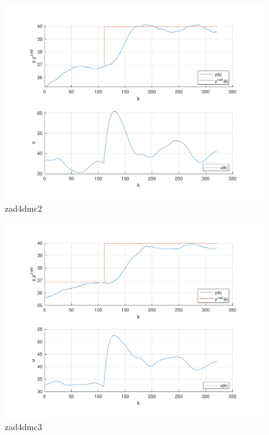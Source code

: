 \begin{figure}[H]
    \centering
    \includegraphics[scale=0.75]{../lab/zad_4/zad4dmc2.pdf}
    \caption{zad4dmc2}
\end{figure}

\begin{figure}[H]
    \centering
    \includegraphics[scale=0.75]{../lab/zad_4/zad4dmc3.pdf}
    \caption{zad4dmc3}
\end{figure}
